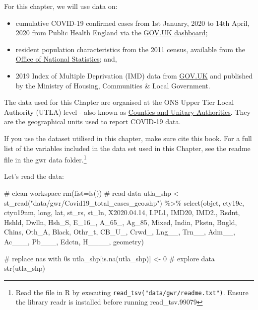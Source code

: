 \documentclass[
  letterpaper,
  krantz2]{style/krantz}
\newenvironment{Shaded}{\begin{snugshade}}{\end{snugshade}}
\newcommand{\AttributeTok}[1]{\textcolor[rgb]{0.40,0.45,0.13}{#1}}
\newcommand{\CommentTok}[1]{\textcolor[rgb]{0.37,0.37,0.37}{#1}}
\newcommand{\DecValTok}[1]{\textcolor[rgb]{0.68,0.00,0.00}{#1}}
\newcommand{\FloatTok}[1]{\textcolor[rgb]{0.68,0.00,0.00}{#1}}
\newcommand{\FunctionTok}[1]{\textcolor[rgb]{0.28,0.35,0.67}{#1}}
\newcommand{\NormalTok}[1]{\textcolor[rgb]{0.00,0.23,0.31}{#1}}
\newcommand{\OtherTok}[1]{\textcolor[rgb]{0.00,0.23,0.31}{#1}}
\newcommand{\SpecialCharTok}[1]{\textcolor[rgb]{0.37,0.37,0.37}{#1}}
\newcommand{\StringTok}[1]{\textcolor[rgb]{0.13,0.47,0.30}{#1}}
\begin{document}
For this chapter, we will use data on:

\begin{itemize}
\item
  cumulative COVID-19 confirmed cases from 1st January, 2020 to 14th
  April, 2020 from Public Health England via the
  \href{https://coronavirus.data.gov.uk}{GOV.UK dashboard};
\item
  resident population characteristics from the 2011 census, available
  from the \href{https://www.nomisweb.co.uk/home/census2001.asp}{Office
  of National Statistics}; and,
\item
  2019 Index of Multiple Deprivation (IMD) data from
  \href{https://www.gov.uk/government/statistics/english-indices-of-deprivation-2019}{GOV.UK}
  and published by the Ministry of Housing, Communities \& Local
  Government.
\end{itemize}

The data used for this Chapter are organised at the ONS Upper Tier Local
Authority (UTLA) level - also known as
\href{https://geoportal.statistics.gov.uk}{Counties and Unitary
Authorities}. They are the geographical units used to report COVID-19
data.

If you use the dataset utilised in this chapter, make sure cite this
book. For a full list of the variables included in the data set used in
this Chapter, see the readme file in the gwr data folder.\footnote{Read
  the file in R by executing \texttt{read\_tsv("data/gwr/readme.txt")}.
  Ensure the library readr is installed before running read\_tsv.99079}

Let's read the data:

\begin{Shaded}
\begin{Highlighting}[]
\CommentTok{\# clean workspace}
\FunctionTok{rm}\NormalTok{(}\AttributeTok{list=}\FunctionTok{ls}\NormalTok{())}
\CommentTok{\# read data}
\NormalTok{utla\_shp }\OtherTok{\textless{}{-}} \FunctionTok{st\_read}\NormalTok{(}\StringTok{"data/gwr/Covid19\_total\_cases\_geo.shp"}\NormalTok{) }\SpecialCharTok{\%\textgreater{}\%}
  \FunctionTok{select}\NormalTok{(objct, cty19c, ctyu19nm, long, lat, st\_rs, st\_ln, X2020.}\FloatTok{04.14}\NormalTok{, I.PL1, IMD20, IMD2., Rsdnt, Hshld, Dwlln, Hsh\_S, E\_16\_, A\_65\_, Ag\_85, Mixed, Indin, Pkstn, Bngld, Chins, Oth\_A, Black, Othr\_t, CB\_U\_, Crwd\_, Lng\_\_, Trn\_\_, Adm\_\_, Ac\_\_\_, Pb\_\_\_, Edctn, H\_\_\_\_, geometry)}

\CommentTok{\# replace nas with 0s}
\NormalTok{utla\_shp[}\FunctionTok{is.na}\NormalTok{(utla\_shp)] }\OtherTok{\textless{}{-}} \DecValTok{0}
\CommentTok{\# explore data}
\FunctionTok{str}\NormalTok{(utla\_shp)}
\end{Highlighting}
\end{Shaded}
\end{document}
